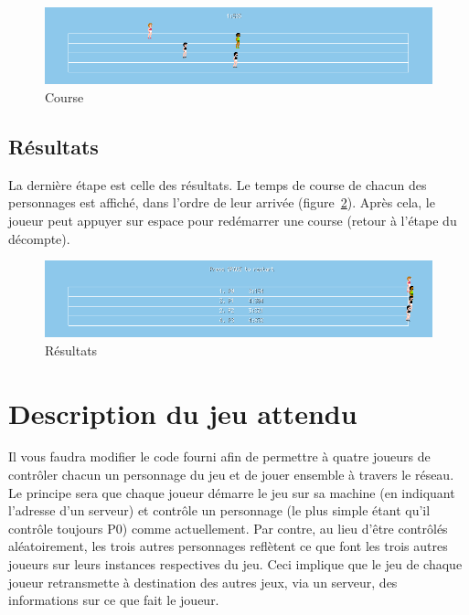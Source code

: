 \documentclass[a4paper]{article}
\begin{document}
\begin{figure}[htbp]
  \centering
  \includegraphics[width=400pt]{course.png}
  \caption{Course}\label{fig:course}
\end{figure}

\subsection{Résultats}

La dernière étape est celle des résultats.
Le temps de course de chacun des personnages est affiché, dans l'ordre de leur arrivée (figure~\ref{fig:resultats}).
Après cela, le joueur peut appuyer sur espace pour redémarrer une course (retour à l'étape du décompte).

\begin{figure}[htbp]
  \centering
  \includegraphics[width=400pt]{results.png}
  \caption{Résultats}\label{fig:resultats}
\end{figure}

\section{Description du jeu attendu}
\label{section:todo}

Il vous faudra modifier le code fourni afin de permettre à quatre joueurs de contrôler chacun un personnage du jeu et de jouer ensemble à travers le réseau.
Le principe sera que chaque joueur démarre le jeu sur sa machine (en indiquant l'adresse d'un serveur) et contrôle un personnage (le plus simple étant qu'il contrôle toujours P0) comme actuellement.
Par contre, au lieu d'être contrôlés aléatoirement, les trois autres personnages reflètent ce que font les trois autres joueurs sur leurs instances respectives du jeu.
Ceci implique que le jeu de chaque joueur retransmette à destination des autres jeux, via un serveur, des informations sur ce que fait le joueur.
\end{document}
